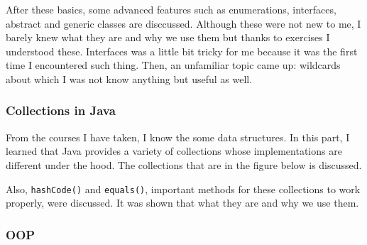 After these basics, some advanced features such as enumerations, interfaces, abstract and generic classes are disccussed. Although these were not new to me, I barely knew what they are and why we use them but thanks to exercises I understood these. Interfaces was a little bit tricky for me because it was the first time I encountered such thing. Then, an unfamiliar topic came up: wildcards about which I was not know anything but useful as well. 

\subsubsection{Collections in Java}

From the courses I have taken, I know the some data structures. In this part, I learned that Java provides a variety of collections whose implementations are different under the hood. The collections that are in the figure below is discussed. 

\begin{figure}[h!]
  \centering
\end{figure}

Also, \texttt{hashCode()} and \texttt{equals()}, important methods for these collections to work properly, were discussed. It was shown that what they are and why we use them.

\subsubsection{OOP}

